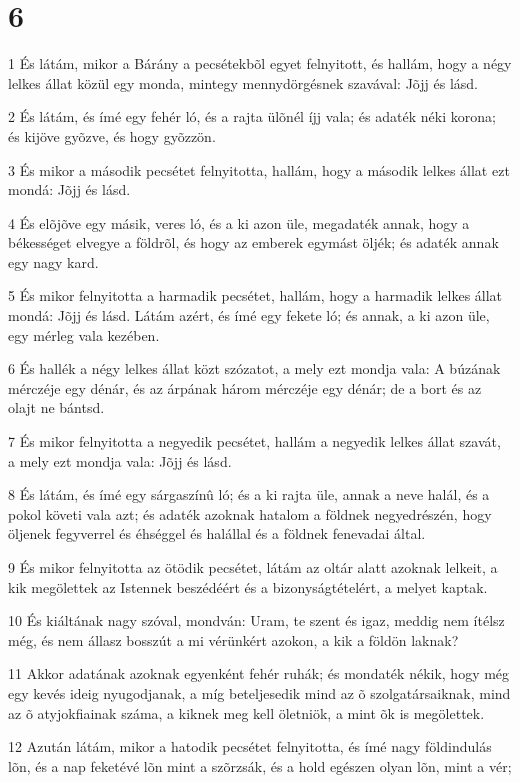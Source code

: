 \chapter{6}

\par 1 És látám, mikor a Bárány a pecsétekbõl egyet felnyitott, és hallám, hogy a négy lelkes állat közül egy monda, mintegy mennydörgésnek szavával: Jõjj és lásd.
\par 2 És látám, és ímé egy fehér ló, és a rajta ülõnél íjj vala; és adaték néki korona; és kijöve gyõzve, és hogy gyõzzön.
\par 3 És mikor a második pecsétet felnyitotta, hallám, hogy a második lelkes állat ezt mondá: Jõjj és lásd.
\par 4 És elõjõve egy másik, veres ló, és a ki azon üle, megadaték annak, hogy a békességet elvegye a földrõl, és hogy az emberek egymást öljék; és adaték annak egy nagy kard.
\par 5 És mikor felnyitotta a harmadik pecsétet, hallám, hogy a harmadik lelkes állat mondá: Jõjj és lásd. Látám azért, és ímé egy fekete ló; és annak, a ki azon üle, egy mérleg vala kezében.
\par 6 És hallék a négy lelkes állat közt szózatot, a mely ezt mondja vala: A búzának mérczéje egy dénár, és az árpának három mérczéje egy dénár; de a bort és az olajt ne bántsd.
\par 7 És mikor felnyitotta a negyedik pecsétet, hallám a negyedik lelkes állat szavát, a mely ezt mondja vala: Jõjj és lásd.
\par 8 És látám, és ímé egy sárgaszínû ló; és a ki rajta üle, annak a neve halál, és a pokol követi vala azt; és adaték azoknak hatalom a földnek negyedrészén, hogy öljenek fegyverrel és éhséggel és halállal és a földnek fenevadai által.
\par 9 És mikor felnyitotta az ötödik pecsétet, látám az oltár alatt azoknak lelkeit, a kik megölettek az Istennek beszédéért és a bizonyságtételért,  a melyet kaptak.
\par 10 És kiáltának nagy szóval, mondván: Uram, te szent és igaz, meddig nem ítélsz még, és nem állasz bosszút a mi vérünkért azokon, a kik a földön laknak?
\par 11 Akkor adatának azoknak egyenként fehér ruhák; és mondaték nékik, hogy még egy kevés ideig nyugodjanak, a míg beteljesedik mind az õ szolgatársaiknak, mind az õ atyjokfiainak száma, a kiknek meg kell öletniök, a mint õk is megölettek.
\par 12 Azután látám, mikor a hatodik pecsétet felnyitotta, és ímé nagy földindulás lõn, és a nap feketévé lõn mint a szõrzsák, és a hold egészen olyan lõn, mint a vér;
